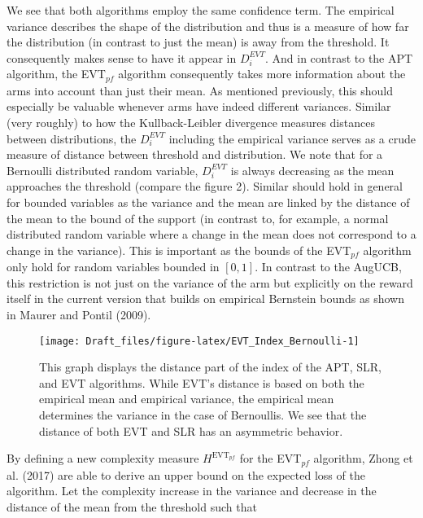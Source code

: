\documentclass[11pt,]{article}
\begin{document}
We see that both algorithms employ the same confidence term. The
empirical variance describes the shape of the distribution and thus is a
measure of how far the distribution (in contrast to just the mean) is
away from the threshold. It consequently makes sense to have it appear
in \(D_i^{EVT}\). And in contrast to the APT algorithm, the EVT\(_{pf}\)
algorithm consequently takes more information about the arms into
account than just their mean. As mentioned previously, this should
especially be valuable whenever arms have indeed different variances.
Similar (very roughly) to how the Kullback-Leibler divergence measures
distances between distributions, the \(D_i^{EVT}\) including the
empirical variance serves as a crude measure of distance between
threshold and distribution. We note that for a Bernoulli distributed
random variable, \(D_i^{EVT}\) is always decreasing as the mean
approaches the threshold (compare the figure 2). Similar should hold in
general for bounded variables as the variance and the mean are linked by
the distance of the mean to the bound of the support (in contrast to,
for example, a normal distributed random variable where a change in the
mean does not correspond to a change in the variance). This is important
as the bounds of the EVT\(_{pf}\) algorithm only hold for random
variables bounded in \([0,1]\). In contrast to the AugUCB, this
restriction is not just on the variance of the arm but explicitly on the
reward itself in the current version that builds on empirical Bernstein
bounds as shown in Maurer and Pontil (2009).

\begin{figure}

{\centering \texttt{[image: Draft\_files/figure-latex/EVT\_Index\_Bernoulli-1]} 

}

\caption{This graph displays the distance part of the index of the APT, SLR, and EVT algorithms. While EVT's distance is based on both the empirical mean and empirical variance, the empirical mean determines the variance in the case of Bernoullis. We see that the distance of both EVT and SLR has an asymmetric behavior.}\label{fig:EVT_Index_Bernoulli}
\end{figure}

By defining a new complexity measure \(H^{\text{EVT}_{pf}}\) for the
EVT\(_{pf}\) algorithm, Zhong et al. (2017) are able to derive an upper
bound on the expected loss of the algorithm. Let the complexity increase
in the variance and decrease in the distance of the mean from the
threshold such that
\end{document}
